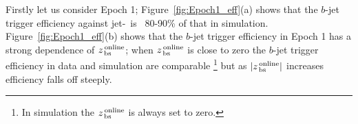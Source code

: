 
Firstly let us consider Epoch 1;
Figure~\ref{fig:Epoch1_eff}(a) shows that the $b$-jet trigger efficiency against jet-\pT~is ~80-90\% of that in simulation.
Figure~\ref{fig:Epoch1_eff}(b) shows that the $b$-jet trigger efficiency in Epoch 1 has a strong dependence of  $z_{\,\text{bs}}^{\text{\,online}}$;
when $z_{\,\text{bs}}^{\text{\,online}}$ is close to zero the $b$-jet trigger efficiency in data and simulation are comparable
\footnote{In simulation the  $z_{\,\text{bs}}^{\text{\,online}}$ is always set to zero.}
but as $|z_{\,\text{bs}}^{\text{\,online}}|$ increases efficiency falls off steeply.

